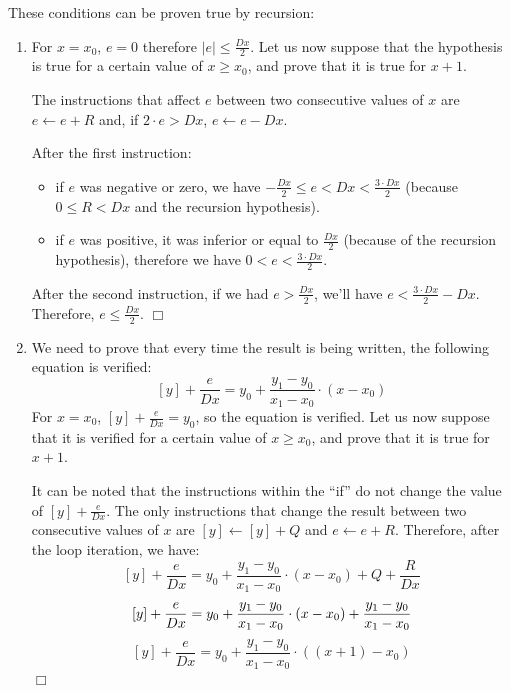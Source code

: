 \documentclass[a4paper,11pt]{kthesis}
\begin{document}
These conditions can be proven true by recursion:
\begin{enumerate}
\item For $x = x_{0}$, $e = 0$ therefore $|e| \leq \frac{Dx}{2}$. Let us now suppose that the hypothesis is true for a certain value of $x \geq x_{0}$, and prove that it is true for $x+1$.

The instructions that affect $e$ between two consecutive values of $x$ are $e \leftarrow e + R$ and, if $2\cdot e > Dx$, $e \leftarrow e - Dx$.

After the first instruction:
\begin{itemize}
\item if $e$ was negative or zero, we have $-\frac{Dx}{2} \leq e < Dx < \frac{3 \cdot Dx}{2} $ (because $0 \leq R < Dx$ and the recursion hypothesis).
\item if $e$ was positive, it was inferior or equal to $\frac{Dx}{2}$ (because of the recursion hypothesis), therefore we have $0 < e < \frac{3 \cdot Dx}{2} $.
\end{itemize}
After the second instruction, if we had $e > \frac{Dx}{2}$, we'll have $e < \frac{3 \cdot Dx}{2} - Dx$. Therefore, $e \leq \frac{Dx}{2}$. $\Box$

\item We need to prove that every time the result is being written, the following equation is verified:
\begin{equation}
\hspace{0cm} [y] + \frac{e}{Dx} = y_{0} + \frac{y_{1}-y_{0}}{x_{1}-x_{0}} \cdot (x - x_{0})
\end{equation}
For $x = x_{0}$, $[y] + \frac{e}{Dx} = y_{0}$, so the equation is verified. Let us now suppose that it is verified for a certain value of $x \geq x_{0}$, and prove that it is true for $x+1$.

It can be noted that the instructions within the ``if'' do not change the value of $[y] + \frac{e}{Dx}$. The only instructions that change the result between two consecutive values of $x$ are $[y] \leftarrow [y] + Q$ and $e \leftarrow e + R$. Therefore, after the loop iteration, we have:
\begin{equation}
\hspace{0cm} [y] + \frac{e}{Dx} = y_{0} + \frac{y_{1}-y_{0}}{x_{1}-x_{0}} \cdot (x - x_{0}) + Q + \frac{R}{Dx}
\end{equation}
\begin{equation}
\hspace{0cm} [y] + \frac{e}{Dx} = y_{0} + \frac{y_{1}-y_{0}}{x_{1}-x_{0}} \cdot (x - x_{0}) + \frac{y_{1}-y_{0}}{x_{1}-x_{0}} \\
\end{equation}
\begin{equation}
\hspace{0cm} [y] + \frac{e}{Dx} = y_{0} + \frac{y_{1}-y_{0}}{x_{1}-x_{0}} \cdot ((x + 1) - x_{0})
\end{equation}
$\Box$
\end{enumerate}
\end{document}
